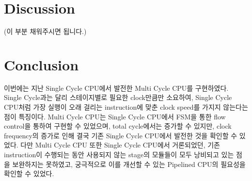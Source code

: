 \documentclass[openright, a4paper]{article}
\begin{document}
\section{Discussion}

(이 부분 채워주시면 됩니다.)

\section{Conclusion}

이번에는 지난 Single Cycle CPU에서 발전한 Multi Cycle CPU를 구현하였다.
Single Cycle과는 달리 스테이지별로 필요한 clock만큼만 소요하여, Single Cycle CPU처럼 가장 실행이 오래 걸리는 instruction에 맞춘 clock speed를 가지지 않는다는 점이 특징이다.
Multi Cycle CPU는 Single Cycle CPU에서 FSM을 통한 flow control을 통하여 구현할 수 있었으며, total cycle에서는 증가할 수 있지만, clock frequency의 증가로 인해 결국 기존 Single Cycle CPU에서 발전한 것을 확인할 수 있었다.
다만 Multi Cycle CPU 또한 Single Cycle CPU에서 거론되었던, 기존 instruction이 수행되는 동안 사용되지 않는 stage의 모듈들이 모두 낭비되고 있는 점을 보완하지는 못하였고, 궁극적으로 이를 개선할 수 있는 Pipelined CPU의 필요성을 확인할 수 있었다.
\end{document}
